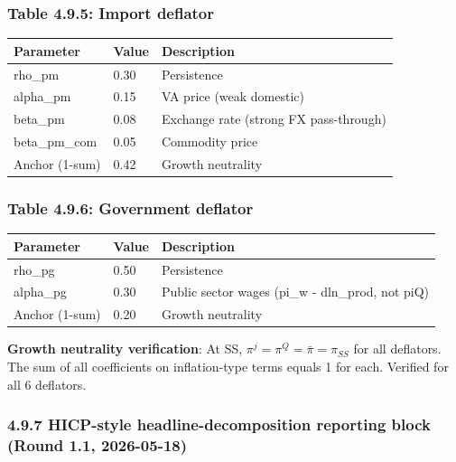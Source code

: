 \documentclass[
]{article}
\newcounter{none} %
\begin{document}
\subsubsection{Table 4.9.5: Import
deflator}\label{table-4.9.5-import-deflator}

{\def\LTcaptype{none} %
\begin{longtable}[]{@{}lll@{}}
\toprule\noalign{}
Parameter & Value & Description \\
\midrule\noalign{}
\endhead
\bottomrule\noalign{}
\endlastfoot
rho\_pm & 0.30 & Persistence \\
alpha\_pm & 0.15 & VA price (weak domestic) \\
beta\_pm & 0.08 & Exchange rate (strong FX pass-through) \\
beta\_pm\_com & 0.05 & Commodity price \\
Anchor (1-sum) & 0.42 & Growth neutrality \\
\end{longtable}
}

\subsubsection{Table 4.9.6: Government
deflator}\label{table-4.9.6-government-deflator}

{\def\LTcaptype{none} %
\begin{longtable}[]{@{}lll@{}}
\toprule\noalign{}
Parameter & Value & Description \\
\midrule\noalign{}
\endhead
\bottomrule\noalign{}
\endlastfoot
rho\_pg & 0.50 & Persistence \\
alpha\_pg & 0.30 & Public sector wages (pi\_w - dln\_prod, not piQ) \\
Anchor (1-sum) & 0.20 & Growth neutrality \\
\end{longtable}
}

\textbf{Growth neutrality verification}: At SS,
\(\pi^j = \pi^Q = \bar{\pi} = \pi_{SS}\) for all deflators. The sum of
all coefficients on inflation-type terms equals 1 for each. Verified for
all 6 deflators.

\subsubsection{4.9.7 HICP-style headline-decomposition reporting block
(Round 1.1,
2026-05-18)}\label{hicp-style-headline-decomposition-reporting-block-round-1.1-2026-05-18}
\end{document}
